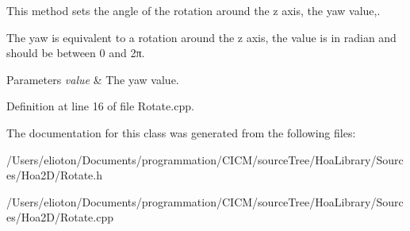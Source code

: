 This method sets the angle of the rotation around the z axis, the yaw value,. 

The yaw is equivalent to a rotation around the z axis, the value is in radian and should be between 0 and 2π.


\begin{DoxyParams}{Parameters}
{\em value} & The yaw value. \\
\hline
\end{DoxyParams}


Definition at line 16 of file Rotate.\-cpp.



The documentation for this class was generated from the following files\-:\begin{DoxyCompactItemize}
\item 
/\-Users/elioton/\-Documents/programmation/\-C\-I\-C\-M/source\-Tree/\-Hoa\-Library/\-Sources/\-Hoa2\-D/Rotate.\-h\item 
/\-Users/elioton/\-Documents/programmation/\-C\-I\-C\-M/source\-Tree/\-Hoa\-Library/\-Sources/\-Hoa2\-D/Rotate.\-cpp\end{DoxyCompactItemize}
